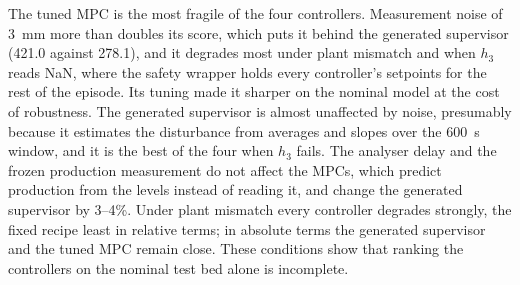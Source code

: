 The tuned MPC is the most fragile of the four controllers. Measurement noise
of 3~mm more than doubles its score, which puts it behind the generated
supervisor (421.0 against 278.1), and it degrades most under plant mismatch
and when $h_3$ reads NaN, where the safety wrapper holds every controller's
setpoints for the rest of the episode. Its tuning made it sharper on the
nominal model at the cost of robustness. The generated supervisor is almost
unaffected by noise, presumably because it estimates the disturbance from
averages and slopes over the 600~s window, and it is the best of the four when $h_3$ fails. The
analyser delay and the frozen production measurement do not affect the MPCs,
which predict production from the levels instead of reading it, and change the generated
supervisor by 3--4\%. Under plant mismatch every controller degrades
strongly, the fixed recipe least in relative terms; in absolute terms the
generated supervisor and the tuned MPC remain close. These conditions show
that ranking the controllers on the nominal test bed alone is incomplete.

